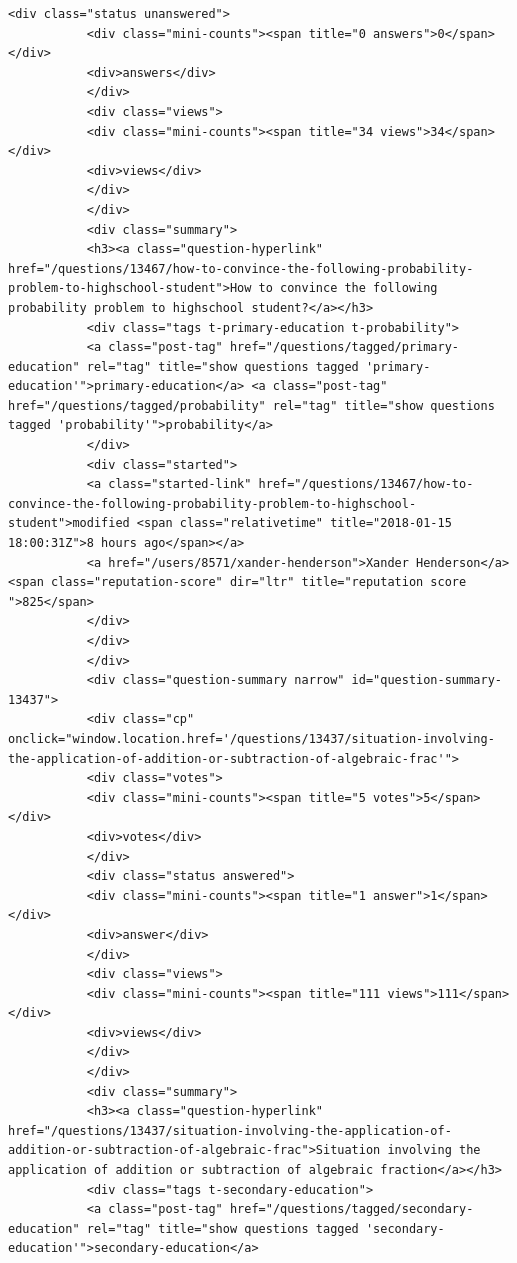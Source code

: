 \documentclass[11pt]{article}
\begin{document}
\begin{Verbatim}[commandchars=\\\{\}]
           <div class="status unanswered">
           <div class="mini-counts"><span title="0 answers">0</span></div>
           <div>answers</div>
           </div>
           <div class="views">
           <div class="mini-counts"><span title="34 views">34</span></div>
           <div>views</div>
           </div>
           </div>
           <div class="summary">
           <h3><a class="question-hyperlink" href="/questions/13467/how-to-convince-the-following-probability-problem-to-highschool-student">How to convince the following probability problem to highschool student?</a></h3>
           <div class="tags t-primary-education t-probability">
           <a class="post-tag" href="/questions/tagged/primary-education" rel="tag" title="show questions tagged 'primary-education'">primary-education</a> <a class="post-tag" href="/questions/tagged/probability" rel="tag" title="show questions tagged 'probability'">probability</a>
           </div>
           <div class="started">
           <a class="started-link" href="/questions/13467/how-to-convince-the-following-probability-problem-to-highschool-student">modified <span class="relativetime" title="2018-01-15 18:00:31Z">8 hours ago</span></a>
           <a href="/users/8571/xander-henderson">Xander Henderson</a> <span class="reputation-score" dir="ltr" title="reputation score ">825</span>
           </div>
           </div>
           </div>
           <div class="question-summary narrow" id="question-summary-13437">
           <div class="cp" onclick="window.location.href='/questions/13437/situation-involving-the-application-of-addition-or-subtraction-of-algebraic-frac'">
           <div class="votes">
           <div class="mini-counts"><span title="5 votes">5</span></div>
           <div>votes</div>
           </div>
           <div class="status answered">
           <div class="mini-counts"><span title="1 answer">1</span></div>
           <div>answer</div>
           </div>
           <div class="views">
           <div class="mini-counts"><span title="111 views">111</span></div>
           <div>views</div>
           </div>
           </div>
           <div class="summary">
           <h3><a class="question-hyperlink" href="/questions/13437/situation-involving-the-application-of-addition-or-subtraction-of-algebraic-frac">Situation involving the application of addition or subtraction of algebraic fraction</a></h3>
           <div class="tags t-secondary-education">
           <a class="post-tag" href="/questions/tagged/secondary-education" rel="tag" title="show questions tagged 'secondary-education'">secondary-education</a>

\end{Verbatim}
\end{document}
